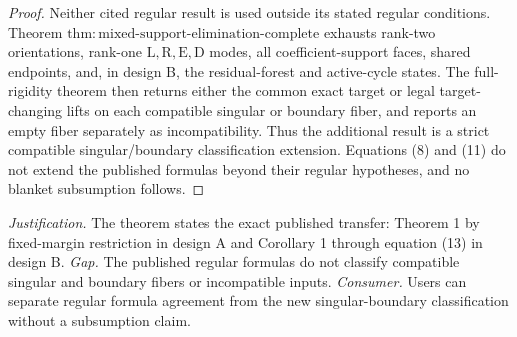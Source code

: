 \documentclass{article}
\begin{document}
\begin{proof}
Neither cited regular result is used outside its stated regular conditions.  Theorem \(\mathrm{thm{:}mixed\text{-}support\text{-}elimination\text{-}complete}\) exhausts rank-two orientations, rank-one \(\mathrm L,\mathrm R,\mathrm E,\mathrm D\) modes, all coefficient-support faces, shared endpoints, and, in design B, the residual-forest and active-cycle states.  The full-rigidity theorem then returns either the common exact target or legal target-changing lifts on each compatible singular or boundary fiber, and reports an empty fiber separately as incompatibility.  Thus the additional result is a strict compatible singular/boundary classification extension.  Equations (8) and (11) do not extend the published formulas beyond their regular hypotheses, and no blanket subsumption follows.
\end{proof}
\par\smallskip\noindent \textit{Justification.} The theorem states the exact published transfer: Theorem 1 by fixed-margin restriction in design A and Corollary 1 through equation (13) in design B. \textit{Gap.} The published regular formulas do not classify compatible singular and boundary fibers or incompatible inputs. \textit{Consumer.} Users can separate regular formula agreement from the new singular-boundary classification without a subsumption claim.
\end{document}
